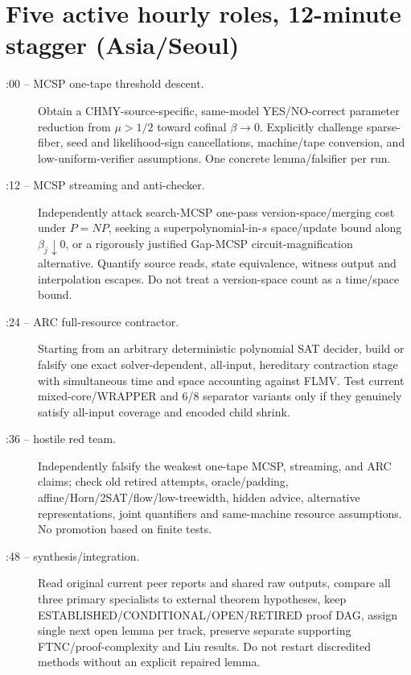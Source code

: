 \documentclass[11pt]{article}
\begin{document}
\section*{Five active hourly roles, 12-minute stagger (Asia/Seoul)}
\begin{description}
\item[:00 -- MCSP one-tape threshold descent.] Obtain a CHMY-source-specific, same-model YES/NO-correct parameter reduction from $\mu>1/2$ toward cofinal $\beta\to0$. Explicitly challenge sparse-fiber, seed and likelihood-sign cancellations, machine/tape conversion, and low-uniform-verifier assumptions. One concrete lemma/falsifier per run.
\item[:12 -- MCSP streaming and anti-checker.] Independently attack search-MCSP one-pass version-space/merging cost under $P=NP$, seeking a superpolynomial-in-$s$ space/update bound along $\beta_j\downarrow0$, or a rigorously justified Gap-MCSP circuit-magnification alternative. Quantify source reads, state equivalence, witness output and interpolation escapes. Do not treat a version-space count as a time/space bound.
\item[:24 -- ARC full-resource contractor.] Starting from an arbitrary deterministic polynomial SAT decider, build or falsify one exact solver-dependent, all-input, hereditary contraction stage with simultaneous time and space accounting against FLMV. Test current mixed-core/WRAPPER and 6/8 separator variants only if they genuinely satisfy all-input coverage and encoded child shrink.
\item[:36 -- hostile red team.] Independently falsify the weakest one-tape MCSP, streaming, and ARC claims; check old retired attempts, oracle/padding, affine/Horn/2SAT/flow/low-treewidth, hidden advice, alternative representations, joint quantifiers and same-machine resource assumptions. No promotion based on finite tests.
\item[:48 -- synthesis/integration.] Read original current peer reports and shared raw outputs, compare all three primary specialists to external theorem hypotheses, keep ESTABLISHED/CONDITIONAL/OPEN/RETIRED proof DAG, assign single next open lemma per track, preserve separate supporting FTNC/proof-complexity and Liu results. Do not restart discredited methods without an explicit repaired lemma.
\end{description}
\end{document}
